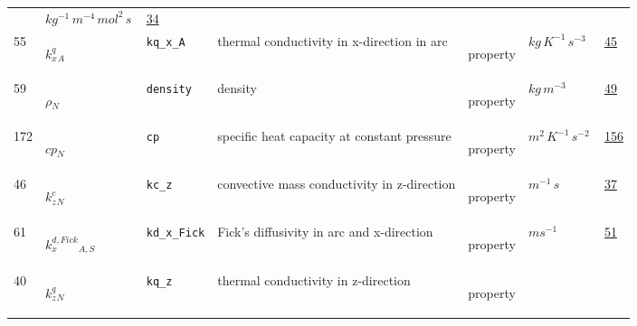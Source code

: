 \begin{longtable}{|p{1cm}|p{2.5cm}|p{4.5cm}|p{8cm}|p{3.0cm}|p{3cm}|p{1cm}|}
             & $ kg^{-1} \,m^{-4} \,mol^{2} \,s \, $
             &                 \hyperlink{"e:34"}{ 34 }
                 \\
            55
             & \hypertarget{"v:55"}{ $ {{k^q_x}}{_{A}} $}
             & \verb|kq_x_A|
             & thermal conductivity in x-direction in arc
             & \begin{lay}property \end{lay}
             & $ kg \,K^{-1} \,s^{-3} \, $
             &                 \hyperlink{"e:45"}{ 45 }
                 \\
            59
             & \hypertarget{"v:59"}{ $ {\rho}{_{N}} $}
             & \verb|density|
             & density
             & \begin{lay}property \end{lay}
             & $ kg \,m^{-3} \, $
             &                 \hyperlink{"e:49"}{ 49 }
                 \\
            172
             & \hypertarget{"v:172"}{ $ {cp}{_{N}} $}
             & \verb|cp|
             & specific heat capacity at constant pressure
             & \begin{lay}property \end{lay}
             & $ m^{2} \,K^{-1} \,s^{-2} \, $
             &                 \hyperlink{"e:156"}{ 156 }
                 \\
            46
             & \hypertarget{"v:46"}{ $ {{k^c_z}}{_{N}} $}
             & \verb|kc_z|
             &  convective mass conductivity in z-direction
             & \begin{lay}property \end{lay}
             & $ m^{-1} \,s \, $
             &                 \hyperlink{"e:37"}{ 37 }
                 \\
            61
             & \hypertarget{"v:61"}{ $ {{k^{d,Fick}_x}}{_{A, S}} $}
             & \verb|kd_x_Fick|
             & Fick's diffusivity in arc and x-direction 
             & \begin{lay}property \end{lay}
             & $ m s^{-1} \, $
             &                 \hyperlink{"e:51"}{ 51 }
                 \\
            40
             & \hypertarget{"v:40"}{ $ {{k^q_z}}{_{N}} $}
             & \verb|kq_z|
             & thermal conductivity in z-direction
             & \begin{lay}property \end{lay}

\end{longtable}
